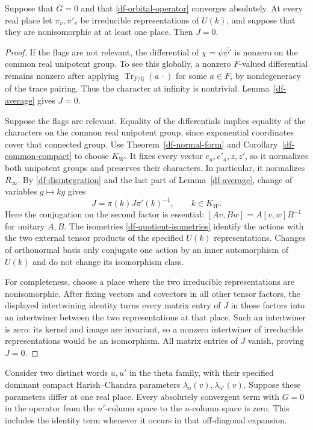 \begin{theorem}\label{df-operator-vanishing}
Suppose that $G=0$ and that \eqref{df-orbital-operator} converges
absolutely.  At every real place let $\pi_v,\pi'_v$
be irreducible representations of $U(k)$, and suppose that they
are nonisomorphic at at least one place.  Then $J=0$.
\end{theorem}

\begin{proof}
If the flags are not relevant, the differential of
$\chi=\psi\overline{\psi'}$ is nonzero on the common real
unipotent group.  To see this globally, a nonzero $F$-valued
differential remains nonzero after applying
$\operatorname{Tr}_{F/\mathbb Q}(a\,\cdot)$ for some $a\in F$,
by nondegeneracy of the trace pairing.  Thus the character at
infinity is nontrivial.  Lemma~\ref{df-average} gives $J=0$.

Suppose the flags are relevant.  Equality of the differentials
implies equality of the characters on the common real unipotent
group, since exponential coordinates cover that connected group.
Use Theorem~\ref{df-normal-form} and
Corollary~\ref{df-common-compact} to choose $K_W$.
It fixes every vector $e_a,e'_a,z,z'$, so it normalizes both
unipotent groups and preserves their characters.  In particular,
it normalizes $R_\infty$.
By \eqref{df-disintegration} and the last part of
Lemma~\ref{df-average}, change of variables $g\mapsto kg$ gives
\[
 J=\pi(k)J\pi'(k)^{-1},\qquad k\in K_W.
\]
Here the conjugation on the second factor is essential:
$[Av,Bw]=A[v,w]B^{-1}$ for unitary $A,B$.
The isometries \eqref{df-quotient-isometries} identify the actions
with the two external tensor products of the specified $U(k)$
representations.  Changes of orthonormal basis only conjugate
one action by an inner automorphism of $U(k)$ and do not change
its isomorphism class.

For completeness, choose a place where the two irreducible
representations are nonisomorphic.  After fixing vectors and
covectors in all other tensor factors, the displayed intertwining
identity turns every matrix entry of $J$ in those factors into an
intertwiner between the two representations at that place.
Such an intertwiner is zero: its kernel and image are invariant,
so a nonzero intertwiner of irreducible representations would be
an isomorphism.  All matrix entries of $J$ vanish, proving $J=0$.
\end{proof}

\begin{corollary}\label{df-points}
Consider two distinct words $u,u'$ in the theta family, with their
specified dominant compact Harish--Chandra parameters
$\lambda_u(v),\lambda_{u'}(v)$.  Suppose these parameters differ
at one real place.  Every absolutely convergent term with $G=0$
in the operator from the $u'$-column space to the $u$-column space
is zero.  This includes the identity term whenever it occurs in
that off-diagonal expansion.
\end{corollary}

